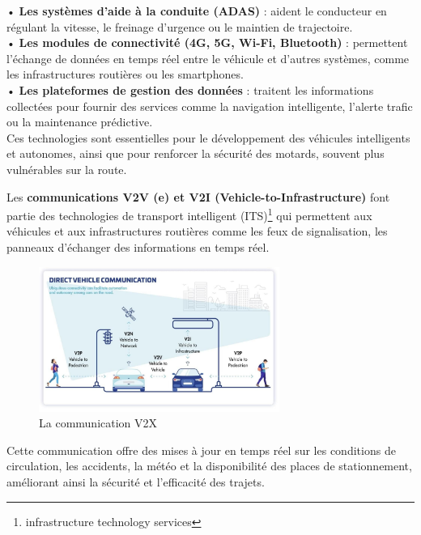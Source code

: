 • \textbf{Les systèmes d’aide à la conduite (ADAS)} : aident le conducteur en régulant la vitesse, le freinage d’urgence ou le maintien de trajectoire.\\
• \textbf{Les modules de connectivité (4G, 5G, Wi-Fi, Bluetooth)} : permettent l’échange de données en temps réel entre le véhicule et d’autres systèmes, comme les infrastructures routières ou les smartphones.\\
• \textbf{Les plateformes de gestion des données} : traitent les informations collectées pour fournir des services comme la navigation intelligente, l’alerte trafic ou la maintenance prédictive.\\
Ces technologies sont essentielles pour le développement des véhicules intelligents et autonomes, ainsi que pour renforcer la sécurité des motards, souvent plus vulnérables sur la route.\\
\vspace{0.5cm}

Les \textbf{communications V2V (e) et V2I (Vehicle-to-Infrastructure)} font partie des technologies de transport intelligent (ITS)\footnote{infrastructure technology services} qui permettent aux véhicules et aux infrastructures routières comme les feux de signalisation, les panneaux d’échanger des informations en temps réel.

\begin{figure}[H]
    \centering
    \includegraphics[width=0.7\textwidth]{images/schema_v2.png} 
    \caption{La communication V2X}
\end{figure}

Cette communication offre des mises à jour en temps réel sur les conditions de circulation, les accidents, la météo et la disponibilité des places de stationnement, améliorant ainsi la sécurité et l’efficacité des trajets\cite{joberty_blog}.\\
